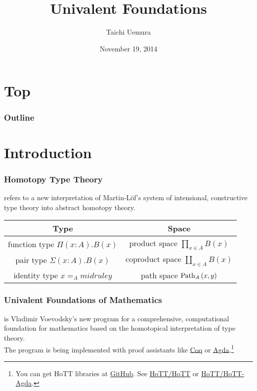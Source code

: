 \documentclass[dvipdfmx]{beamer}
\title{Univalent Foundations}
\author{Taichi Uemura}
\institute[KURIMS]{\url{uemura@kurims.kyoto-u.ac.jp}
    \\
    Research Institute for Mathematical Science,
    Kyoto University
  }
\date{November 19, 2014}
\begin{document}
\section{Top}

\begin{frame}
  \titlepage
\end{frame}

\begin{frame}
  \frametitle{Outline}
  \tableofcontents
\end{frame}

\section{Introduction}

\begin{frame}
  \frametitle{Homotopy Type Theory}
  refers to a new interpretation of Martin-L\"of's system of
  intensional, constructive type theory into
  abstract homotopy theory.\cite{hottbook}

  \begin{center}
    \begin{tabular}{c|c}
      \hline
      Type & Space \\
      \hline
      function type
      $\Pi \left( x : A \right) . B \left( x \right)$
      & product space
      $\prod _{x \in A} B \left( x \right)$ \\
      pair type
      $\Sigma \left( x : A \right) . B \left( x \right)$
      & coproduct space
      $\coprod _{x \in A} B \left( x \right)$ \\
      identity type
      $x =_Amidrule y$
      & path space
      ${\rm Path}_A\left( x , y \right)$ \\
      \hline
    \end{tabular}
  \end{center}
\end{frame}

\begin{frame}
  \frametitle{Univalent Foundations of Mathematics}
  is Vladimir Voevodsky's new program
  for a comprehensive, computational foundation for mathematics
  based on the homotopical interpretation of type theory.
  \\
  The program is being implemented with proof assistants
  like \href{https://coq.inria.fr/}{Coq}
  or \href{http://wiki.portal.chalmers.se/agda/pmwiki.php}{Agda}.\footnote{
    You can get HoTT libraries at \href{https://github.com/}{GitHub}.
    See \href{https://github.com/HoTT/HoTT}{HoTT/HoTT}
    or \href{https://github.com/HoTT/HoTT-Agda}{HoTT/HoTT-Agda}.
  }
\end{frame}
\end{document}
